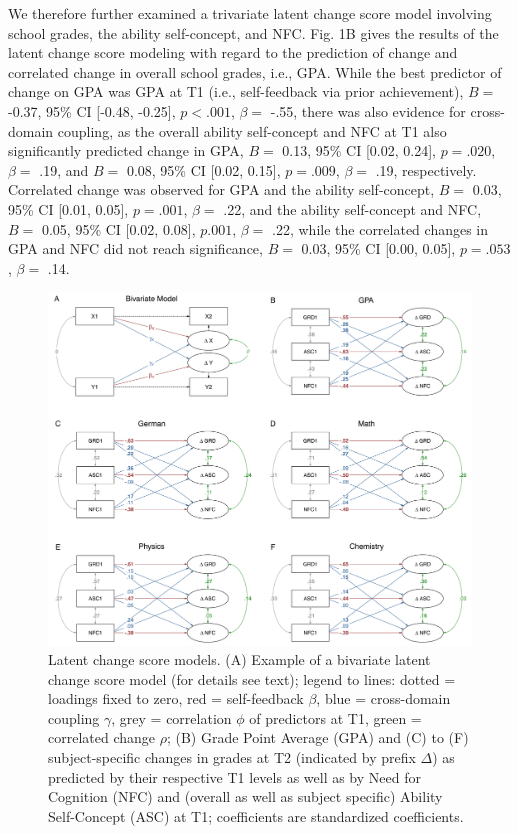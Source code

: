 \documentclass[
  man]{apa6}
\begin{document}
We therefore further examined a trivariate latent change score model involving school grades, the ability self-concept, and NFC. Fig. 1B gives the results of the latent change score modeling with regard to the prediction of change and correlated change in overall school grades, i.e., GPA. While the best predictor of change on GPA was GPA at T1 (i.e., self-feedback via prior achievement), \(B=\) -0.37, 95\% CI {[}-0.48, -0.25{]}, \(p< .001\), \(\beta=\) -.55, there was also evidence for cross-domain coupling, as the overall ability self-concept and NFC at T1 also significantly predicted change in GPA, \(B=\) 0.13, 95\% CI {[}0.02, 0.24{]}, \(p=.020\), \(\beta=\) .19, and \(B=\) 0.08, 95\% CI {[}0.02, 0.15{]}, \(p=.009\), \(\beta=\) .19, respectively. Correlated change was observed for GPA and the ability self-concept, \(B=\) 0.03, 95\% CI {[}0.01, 0.05{]}, \(p=.001\), \(\beta=\) .22, and the ability self-concept and NFC, \(B=\) 0.05, 95\% CI {[}0.02, 0.08{]}, \(p.001\), \(\beta=\) .22, while the correlated changes in GPA and NFC did not reach significance, \(B=\) 0.03, 95\% CI {[}0.00, 0.05{]}, \(p=.053\), \(\beta=\) .14.

\begin{figure}
\centering
\includegraphics{"Fig1.jpg"}
\caption{Latent change score models. (A) Example of a bivariate latent change score model (for details see text); legend to lines: dotted = loadings fixed to zero, red = self-feedback \(\beta\), blue = cross-domain coupling \(\gamma\), grey = correlation \(\phi\) of predictors at T1, green = correlated change \(\rho\); (B) Grade Point Average (GPA) and (C) to (F) subject-specific changes in grades at T2 (indicated by prefix \(\Delta\)) as predicted by their respective T1 levels as well as by Need for Cognition (NFC) and (overall as well as subject specific) Ability Self-Concept (ASC) at T1; coefficients are standardized coefficients.}
\end{figure}
\end{document}
